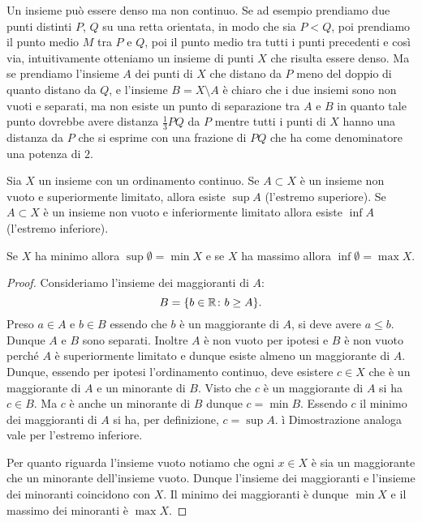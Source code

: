 \begin{example}
Un insieme può essere denso ma non continuo. 
Se ad esempio prendiamo due punti distinti $P$, $Q$ su una retta orientata, 
in modo che sia $P<Q$, poi prendiamo il punto 
medio $M$ tra $P$ e $Q$, poi il punto medio tra tutti i punti precedenti 
e così via,
intuitivamente otteniamo un insieme di punti $X$ che risulta essere denso.
Ma se prendiamo l'insieme $A$ dei punti di $X$ che distano da $P$ 
meno del doppio di quanto distano da $Q$, 
e l'insieme $B=X\setminus A$ è chiaro che i due insiemi sono non vuoti e 
separati, ma non esiste un punto di separazione tra $A$ e $B$ in quanto 
tale punto dovrebbe avere distanza $\frac 1 3 PQ$ da $P$ mentre tutti i punti 
di $X$ hanno una distanza da $P$ che si esprime con una frazione di $PQ$ 
che ha come denominatore una potenza di $2$.
\end{example}


\begin{theorem}%
  \label{th:sup}%
  \mymark{**}%
  Sia $X$ un insieme con un ordinamento continuo.
  Se $A\subset X$ è un insieme non vuoto
  e superiormente limitato, allora esiste $\sup A$ (l'estremo superiore).
  Se $A\subset X$ è un insieme non vuoto e inferiormente limitato 
  allora esiste $\inf A$ (l'estremo inferiore).

  Se $X$ ha minimo allora $\sup\emptyset = \min X$
  e se $X$ ha massimo allora $\inf\emptyset = \max X$.
  \end{theorem}
  \begin{proof}
  \mymark{*}
  Consideriamo l'insieme dei maggioranti di $A$:
  \[
  B = {\left\{  b\in {\mathbb R} \colon b \ge A \right\}}.
  \]
  Preso $a\in A$ e $b\in B$ essendo che $b$ è un maggiorante di $A$,
  si deve avere $a\le b$. Dunque $A$ e $B$ sono separati.
  Inoltre $A$ è non vuoto per ipotesi e $B$ è non vuoto perché 
  $A$ è superiormente limitato e dunque esiste almeno un maggiorante di $A$.
  Dunque, essendo per ipotesi l'ordinamento continuo,
  deve esistere $c\in X$ che è un maggiorante di $A$ e un minorante di $B$.
  Visto che $c$ è un maggiorante di $A$ si ha $c\in B$.
  Ma $c$ è anche un minorante di $B$ dunque $c=\min B$.
  Essendo $c$ il minimo dei maggioranti di $A$ si ha, per definizione,
  $c= \sup A$.
ì
  Dimostrazione analoga vale per l'estremo inferiore.

  Per quanto riguarda l'insieme vuoto notiamo che ogni $x\in X$ 
  è sia un maggiorante che un minorante dell'insieme vuoto.
  Dunque l'insieme dei maggioranti e l'insieme dei minoranti coincidono con $X$.
  Il minimo dei maggioranti è dunque $\min X$ e il massimo dei minoranti è $\max X$.
\end{proof}

